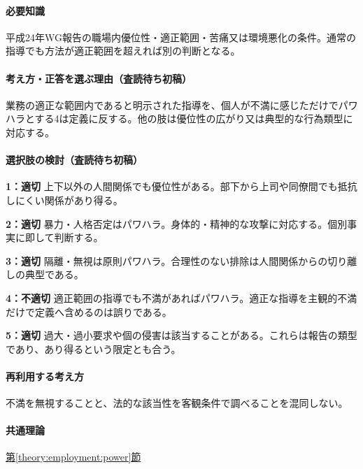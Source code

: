 \paragraph{必要知識} 平成24年WG報告の職場内優位性・適正範囲・苦痛又は環境悪化の条件。通常の指導でも方法が適正範囲を超えれば別の判断となる。

\paragraph{考え方・正答を選ぶ理由（査読待ち初稿）} 業務の適正な範囲内であると明示された指導を、個人が不満に感じただけでパワハラとする4は定義に反する。他の肢は優位性の広がり又は典型的な行為類型に対応する。

\paragraph{選択肢の検討（査読待ち初稿）}\mbox{}\par

\noindent\textbf{1：適切} 上下以外の人間関係でも優位性がある。部下から上司や同僚間でも抵抗しにくい関係があり得る。\par

\noindent\textbf{2：適切} 暴力・人格否定はパワハラ。身体的・精神的な攻撃に対応する。個別事実に即して判断する。\par

\noindent\textbf{3：適切} 隔離・無視は原則パワハラ。合理性のない排除は人間関係からの切り離しの典型である。\par

\noindent\textbf{4：不適切} 適正範囲の指導でも不満があればパワハラ。適正な指導を主観的不満だけで定義へ含めるのは誤りである。\par

\noindent\textbf{5：適切} 過大・過小要求や個の侵害は該当することがある。これらは報告の類型であり、あり得るという限定とも合う。\par

\paragraph{再利用する考え方} 不満を無視することと、法的な該当性を客観条件で調べることを混同しない。

\paragraph{共通理論} \hyperref[theory:employment:power]{第\ref*{theory:employment:power}節}


